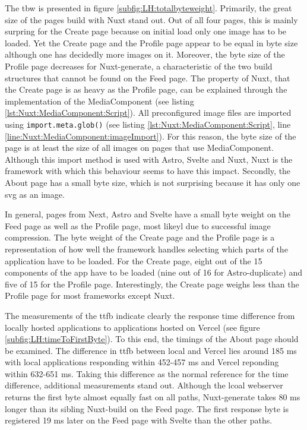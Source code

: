 \documentclass[a4paper, 10pt]{article}
\begin{document}
The \acrlong{tbw} is presented in figure \ref{subfig:LH:totalbyteweight}.
Primarily, the great size of the pages build with Nuxt stand out.
Out of all four pages, this is mainly surpring for the Create page because on initial load only one image has to be loaded.
Yet the Create page and the Profile page appear to be equal in byte size although one has decidedly more images on it.
Moreover, the byte size of the Profile page decreases for Nuxt-generate, a characteristic of the two build structures that cannot be found on the Feed page.
The property of Nuxt, that the Create page is as heavy as the Profile page, can be explained through the implementation of the MediaComponent (see listing \ref{lst:Nuxt:MediaComponent:Script}).
All preconfigured image files are imported using \lstinline{import.meta.glob()} (see listing \ref{lst:Nuxt:MediaComponent:Script}, line \ref{line:Nuxt:MediaComponent:imageImport}).
For this reason, the byte size of the page is at least the size of all images on pages that use MediaComponent.
Although this import method is used with Astro, Svelte and Nuxt, Nuxt is the framework with which this behaviour seems to have this impact.
Secondly, the About page has a small byte size, which is not surprising because it has only one \acrshort{svg} as an image.

In general, pages from Next, Astro and Svelte have a small byte weight on the Feed page as well as the Profile page, most likeyl due to successful image compression.
The byte weight of the Create page and the Profile page is a representation of how well the framework handles selecting which parts of the application have to be loaded.
For the Create page, eight out of the 15 components of the app have to be loaded (nine out of 16 for Astro-duplicate) and five of 15 for the Profile page.
Interestingly, the Create page weighs less than the Profile page for most frameworks except Nuxt.

The measurements of the \acrlong{ttfb} indicate clearly the response time difference from locally hosted applications to applications hosted on Vercel (see figure \ref{subfig:LH:timeToFirstByte}).
To this end, the timings of the About page should be examined.
The difference in \acrshort{ttfb} between local and Vercel lies around 185 ms with local applications responding within 452-457 ms and Vercel reponding within 632-651 ms.
Taking this difference as the normal reference for the time difference, additional measurements stand out.
Although the lcoal webserver returns the first byte almost equally fast on all paths, Nuxt-generate takes 80 ms longer than its sibling Nuxt-build on the Feed page.
The first response byte is registered 19 ms later on the Feed page with Svelte than the other paths.
\end{document}
